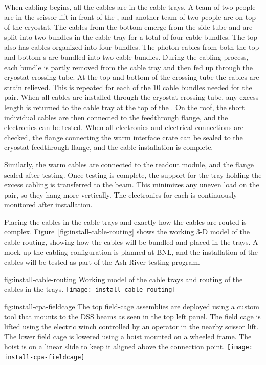 When cabling begins, all the cables are in the cable trays. 
A team of two people are in the scissor lift in front of the , and another team of two people are on top of the cryostat. 
The  cables from the bottom  emerge from the  side-tube and are split into two bundles in the cable tray for a total of four cable bundles. 
The top  also has  cables organized into four bundles. 
The photon cables from both the top and bottom s are bundled into two cable bundles.
During the cabling process, each bundle is partly removed from the cable tray and then fed up through the cryostat crossing tube. 
At the top and bottom of the crossing tube  the cables are strain relieved.
This is repeated for each of the 10 cable bundles needed for the  pair. 
When all cables are installed through the cryostat crossing tube, any excess length is returned to the cable tray at the top of the . 
On the roof, the short individual cables are then connected to the feedthrough flange, and the electronics can be tested. When all electronics and electrical connections are checked, the flange connecting the warm interface crate can be sealed to the cryostat feedthrough flange, and the cable installation is complete. 

Similarly, the  warm cables are connected to the readout module, and the flange sealed after testing.  Once testing is complete, the support for the tray holding the excess cabling is transferred to the  beam.  This minimizes any uneven load on the  pair, so they hang more vertically.   
The electronics for each  is continuously monitored after installation. 

Placing the cables in the cable trays and exactly how the cables are routed is complex. Figure~\ref{fig:install-cable-routing} shows the working 3-D model of the cable routing, showing how the cables will be bundled and placed in the trays. A mock up the cabling configuration is planned at BNL, and the installation of the cables will be tested as part of the Ash River testing program.

\begin{dunefigure}{fig:install-cable-routing}
  {Working model of the cable trays and routing of the cables in the trays.}
\texttt{[image: install-cable-routing]}
\end{dunefigure}


\begin{dunefigure}{fig:install-cpa-fieldcage}
  {The top field-cage assemblies are deployed using a custom tool that mounts to the DSS beams as seen in the top left panel. The field cage is lifted using the electric winch controlled by an operator in the nearby scissor lift. The lower field cage is lowered using a hoist mounted on a wheeled frame. The hoist is on a linear slide to keep it aligned above the connection point.}
\texttt{[image: install-cpa-fieldcage]}
\end{dunefigure}

